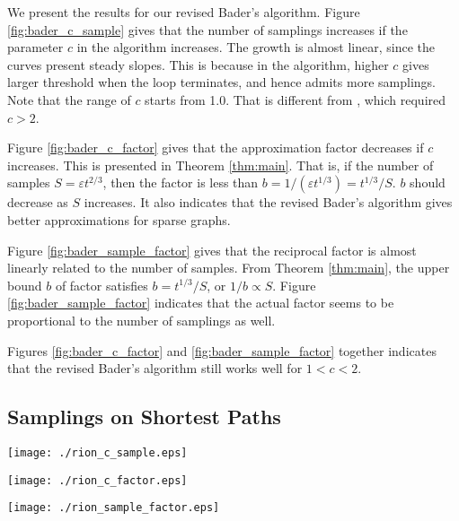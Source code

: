 \documentclass[10pt]{article}
\begin{document}
We present the results for our revised Bader's algorithm. 
Figure \ref{fig:bader_c_sample} gives that the number of samplings increases if the parameter $c$ in the algorithm increases. The growth is almost linear, since the curves present steady slopes. This is because in the algorithm, higher $c$ gives larger threshold when the loop terminates, and hence admits more samplings. Note that the range of $c$ starts from 1.0. That is different from \cite{bader2007approximating}, which required $c>2$. 

Figure \ref{fig:bader_c_factor} gives that the approximation factor decreases if $c$ increases. This is presented in Theorem \ref{thm:main}. That is, if the number of samples $S=\varepsilon t^{2/3}$, then the factor is less than $b = 1/(\varepsilon t^{1/3}) = t^{1/3}/S$. $b$ should decrease as $S$ increases. It also indicates that the revised Bader's algorithm gives better approximations for sparse graphs.

Figure \ref{fig:bader_sample_factor} gives that the reciprocal factor is almost linearly related to the number of samples. From Theorem \ref{thm:main}, the upper bound $b$ of factor satisfies $b = t^{1/3}/S$, or $1/b \propto S$. Figure \ref{fig:bader_sample_factor} indicates that the actual factor seems to be proportional to the number of samplings as well. 

Figures \ref{fig:bader_c_factor} and \ref{fig:bader_sample_factor} together indicates that the revised Bader's algorithm still works well for $1<c<2$.

\subsection{Samplings on Shortest Paths}

\begin{figure*}[!t]
\centering
\begin{minipage}[t]{0.3\textwidth}
\centering
\texttt{[image: ./rion\_c\_sample.eps]}
\caption{$c \sim \textrm{\# samples}$.}
\label{fig:rion_c_sample}
\end{minipage}
\hspace{10pt}
\begin{minipage}[t]{0.3\textwidth}
\centering
\texttt{[image: ./rion\_c\_factor.eps]}
\caption{$c \sim \textrm{factor}$.}
\label{fig:rion_c_factor}
\end{minipage}
\hspace{10pt}
\begin{minipage}[t]{0.3\textwidth}
\centering
\texttt{[image: ./rion\_sample\_factor.eps]}
\caption{$\textrm{\# samples} \sim \textrm{factor}$}
\label{fig:rion_sample_factor}
\end{minipage}
\end{figure*}
\end{document}
